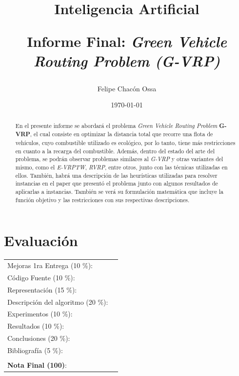 \documentclass[letter, 10pt]{article}
\begin{document}
\title{Inteligencia Artificial \\ \begin{Large}Informe Final:
	 \textit{Green Vehicle Routing Problem (G-VRP)}\end{Large}}
\author{Felipe Chacón Ossa}
\date{\today}
\maketitle

\section*{Evaluaci\'on}

\begin{tabular}{ll}
Mejoras 1ra Entrega (10 \%): &  \underline{\hspace{2cm}}\\
C\'odigo Fuente (10 \%): &  \underline{\hspace{2cm}}\\
Representaci\'on (15 \%):  & \underline{\hspace{2cm}} \\
Descripci\'on del algoritmo (20 \%):  & \underline{\hspace{2cm}} \\
Experimentos (10 \%):  & \underline{\hspace{2cm}} \\
Resultados (10 \%):  & \underline{\hspace{2cm}} \\
Conclusiones (20 \%): &  \underline{\hspace{2cm}}\\
Bibliograf\'ia (5 \%): & \underline{\hspace{2cm}}\\
 &  \\
\textbf{Nota Final (100)}:   & \underline{\hspace{2cm}}
\end{tabular}
\vspace{2cm}

\begin{abstract}
En el presente informe se abordará el problema \textit{Green Vehicle Routing Problem} \textbf{G-VRP}, el cual consiste en optimizar la distancia total que recorre una flota de vehículos, cuyo combustible utilizado es ecológico, por lo tanto, tiene más restricciones en cuanto a la recarga del combustible. 
Además, dentro del estado del arte del problema, se podrán observar problemas similares al \textit{G-VRP} y otras variantes del mismo,
como el \textit{E-VRPTW}, \textit{RVRP}, entre otros, junto con
las técnicas utilizadas en ellos. También, habrá una descripción de las heurísticas utilizadas para
resolver instancias en el paper que presentó el problema junto con algunos resultados de
aplicarlas a instancias. 
También se verá su formulación matemática que incluye la función objetivo y las restricciones con sus
respectivas descripciones. 

\end{abstract}
\end{document}

